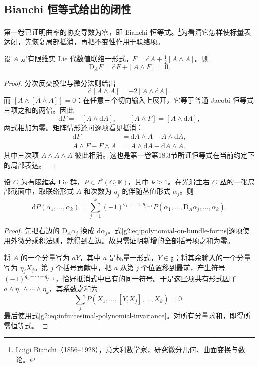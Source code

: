 \subsection{Bianchi 恒等式给出的闭性}
\label{g2:subsec:2201:03}
第一卷已证明曲率的协变导数为零，即 Bianchi 恒等式。\footnote{Luigi Bianchi（1856--1928），意大利数学家，研究微分几何、曲面变换与数论。}为看清它怎样使标量表达闭，先恢复局部抵消，再把不变性作用于联络项。

\begin{proposition}\label{g2:prop:cw-bianchi}
	设 \(A\) 是有限维实 Lie 代数值联络一形式，\(F=\mathrm dA+\tfrac12[A\wedge A]\)。则
	\begin{equation}\label{g2:eq:cw-bianchi}
		\mathrm D_AF=\mathrm dF+[A\wedge F]=0.
	\end{equation}
\end{proposition}
\begin{proof}
	分次反交换律与微分法则给出
	\[
		\mathrm d[A\wedge A]=-2[A\wedge\mathrm dA].
	\]
	而 \([A\wedge[A\wedge A]]=0\)：在任意三个切向输入上展开，它等于普通 Jacobi 恒等式三项之和的两倍。因此
	\[
		\mathrm dF=-[A\wedge\mathrm dA],\qquad
		[A\wedge F]=[A\wedge\mathrm dA],
	\]
	两式相加为零。矩阵情形还可逐项看见抵消：
	\[
	\begin{aligned}
		\mathrm dF&=\mathrm dA\wedge A-A\wedge\mathrm dA,\\
		A\wedge F-F\wedge A&=A\wedge\mathrm dA-\mathrm dA\wedge A.
	\end{aligned}
	\]
	其中三次项 \(A\wedge A\wedge A\) 彼此相消。这也是第一卷第18.3节所证恒等式在当前约定下的局部表达。
\end{proof}

\begin{lemma}\label{g2:lem:invariant-form-differential}
	设 \(G\) 为有限维实 Lie 群，\(P\in I^k(G;\mathbb K)\)，其中 \(k\ge1\)。在光滑主右 \(G\) 丛的一张局部截面中，取联络形式 \(A\) 和次数为 \(q_j\) 的伴随丛值形式 \(\alpha_j\)。则
	\begin{equation}\label{g2:eq:invariant-form-differential}
		\mathrm dP(\alpha_1,\ldots,\alpha_k)
		=\sum_{j=1}^k(-1)^{q_1+\cdots+q_{j-1}}
		P(\alpha_1,\ldots,\mathrm D_A\alpha_j,\ldots,\alpha_k).
	\end{equation}
\end{lemma}
\begin{proof}
	先把右边的 \(\mathrm D_A\alpha_j\) 换成 \(\mathrm d\alpha_j\)。式\eqref{g2:eq:polynomial-on-bundle-forms}逐项使用外微分乘积法则，就得到左边。故只需证明新增的全部括号项之和为零。

	将 \(A\) 的一个分量写为 \(aY\)，其中 \(a\) 是标量一形式，\(Y\in\mathfrak g\)；将其余输入的一个分量写为 \(\eta_jX_j\)。第 \(j\) 个括号贡献中，把 \(a\) 从第 \(j\) 个位置移到最前，产生符号 \((-1)^{q_1+\cdots+q_{j-1}}\)，恰好抵消式中已有的同一符号。于是这些项共有形式因子 \(a\wedge\eta_1\wedge\cdots\wedge\eta_k\)，其系数之和为
	\[
		\sum_j P(X_1,\ldots,[Y,X_j],\ldots,X_k)=0,
	\]
	最后使用式\eqref{g2:eq:infinitesimal-polynomial-invariance}。对所有分量求和，即得所需恒等式。
\end{proof}

